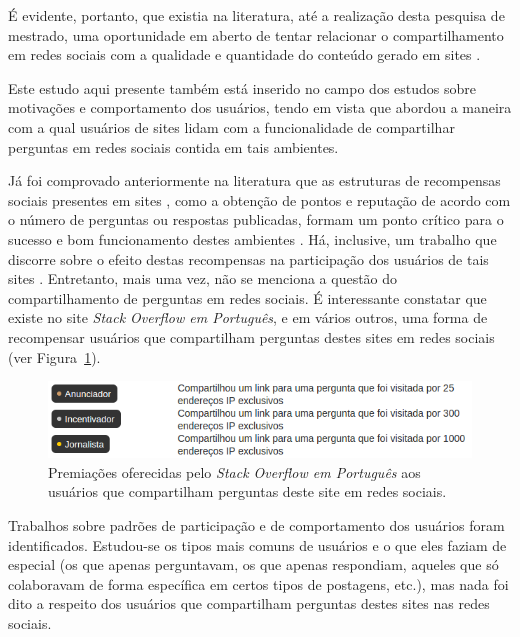 É evidente, portanto, que existia na literatura, até a realização desta pesquisa de mestrado, uma oportunidade em aberto de tentar relacionar o compartilhamento em redes sociais com a qualidade e quantidade do conteúdo gerado em sites \qanospace.


Este estudo aqui presente também está inserido no campo dos estudos sobre motivações e comportamento dos usuários, tendo em vista que abordou a maneira com a qual usuários de sites \qa lidam com a funcionalidade de compartilhar perguntas em redes sociais contida em tais ambientes.

Já foi comprovado anteriormente na literatura que as estruturas de recompensas sociais presentes em sites \qa, como a obtenção de pontos e reputação de acordo com o número de perguntas ou respostas publicadas, formam um ponto crítico para o sucesso e bom funcionamento destes ambientes \cite{shah2008exploring}. Há, inclusive, um trabalho que discorre sobre o efeito destas recompensas na participação dos usuários de tais sites \cite{li2012quantifying}. Entretanto, mais uma vez, não se menciona a questão do compartilhamento de perguntas em redes sociais. É interessante constatar que existe no site \textit{Stack Overflow em Português}, e em vários outros, uma forma de recompensar usuários que compartilham perguntas destes sites em redes sociais (ver Figura~\ref{fig:fig2}).

    \begin{figure}[H]
        \center
        \includegraphics[scale=.6]{./figuras/medalhas-compartilhar-sopt.png}
        \caption{Premiações oferecidas pelo \textit{Stack Overflow em Português} aos usuários que compartilham perguntas deste site em redes sociais.}
        \label{fig:fig2}
    \end{figure}

Trabalhos sobre padrões de participação e de comportamento dos usuários \cite{adamic2008knowledge,furtado2013contributor,bian2008few} foram identificados. Estudou-se os tipos mais comuns de usuários e o que eles faziam de especial (os que apenas perguntavam, os que apenas respondiam, aqueles que só colaboravam de forma específica em certos tipos de postagens, etc.), mas nada foi dito a respeito dos usuários que compartilham perguntas destes sites nas redes sociais.

